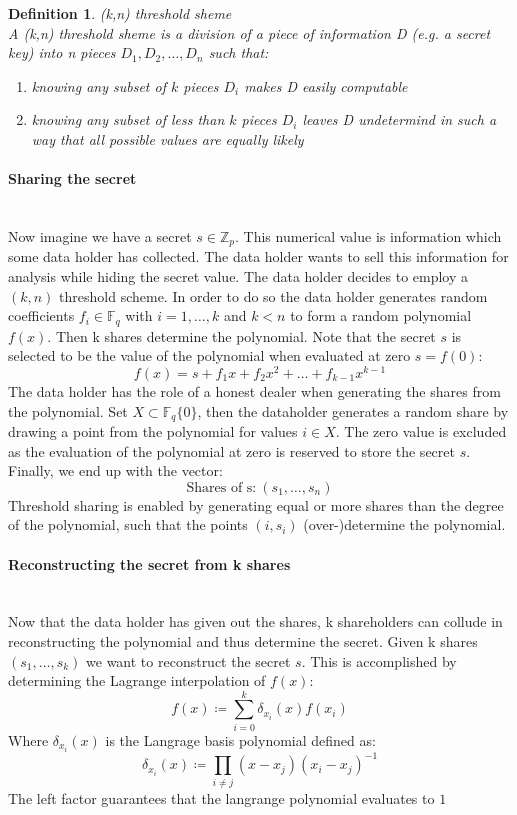 \documentclass[12pt,a4paper]{scrartcl}				%
\newcommand{\myparagraph}[1]{\paragraph{#1}\mbox{}\\} %
\begin{document}
\newtheorem{KNSS}{Definition}
\begin{KNSS}
	(k,n) threshold sheme\\
	A (k,n) threshold sheme is a division of a piece of information D (e.g. a secret key) into n pieces $D_1,D_2,\ldots,D_n$ such that:
	\begin{enumerate}
		\item knowing any subset of $k$ pieces $D_i$ makes D easily computable
		\item knowing any subset of less than $k$ pieces $D_i$ leaves D undetermind in such a way that all possible values are equally likely
	\end{enumerate}
\end{KNSS}
\myparagraph{Sharing the secret}
Now imagine we have a secret $s\in\mathbb{Z}_p$. This numerical value is information which some data holder has collected. The data holder wants to sell this information for analysis while hiding the secret value. The data holder decides to employ a $(k,n)$ threshold scheme. In order to do so the data holder generates random coefficients $f_i\in\mathbb{F}_q$ with $i=1,\ldots,k$ and $k<n$ to form a random polynomial $f(x)$. Then k shares determine the polynomial. Note that the secret $s$ is selected to be the value of the polynomial when evaluated at zero $s=f(0)$:
\begin{equation*}
f(x)=s+f_1 x+f_2 x^2+\ldots+f_{k-1} x^{k-1}
\end{equation*}
The data holder has the role of a honest dealer when generating the shares from the polynomial. Set $X\subset\mathbb{F}_q\{0\}$, then the dataholder generates a random share by drawing a point from the polynomial for values $i\in X$. The zero value is excluded as the evaluation of the polynomial at zero is reserved to store the secret $s$. Finally, we end up with the vector:
\begin{equation*}
\text{Shares of s:}\ (s_1,\ldots,s_n)
\end{equation*}
Threshold sharing is enabled by generating equal or more shares than the degree of the polynomial, such that the points $(i,s_i)$ (over-)determine the polynomial.

\myparagraph{Reconstructing the secret from k shares}
Now that the data holder has given out the shares, k shareholders can collude in reconstructing the polynomial and thus determine the secret. Given k shares $(s_1,\ldots,s_k)$ we want to reconstruct the secret $s$. This is accomplished by determining the Lagrange interpolation of $f(x)$:
\begin{equation*}
f(x)\coloneqq \sum_{i=0}^{k} \delta_{x_i}(x) f(x_i)
\end{equation*}
Where $\delta_{x_i}(x)$ is the Langrage basis polynomial defined as:
\begin{equation*}
\delta_{x_i}(x)\coloneqq \prod_{i\neq j} (x-x_j)(x_i-x_j)^{-1}
\end{equation*}
The left factor guarantees that the langrange polynomial evaluates to $1$
\end{document}
